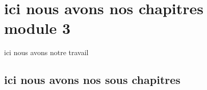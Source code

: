 \chapter{ici nous avons nos chapitres module 3}
ici nous avons notre travail

\section{ici nous avons nos sous chapitres}

